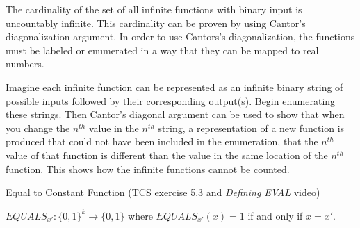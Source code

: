 \documentclass[11pt]{article}
\begin{document}
The cardinality of the set of all infinite functions with binary input is uncountably infinite. This cardinality can be proven by using Cantor's diagonalization argument. In order to use Cantors's diagonalization, the functions must be labeled or enumerated in a way that they can be mapped to real numbers. 

Imagine each infinite function can be represented as an infinite binary string of possible inputs followed by their corresponding output(s). Begin enumerating these strings. Then Cantor's diagonal argument can be used to show that when you change the $n^{th}$ value in the $n^{th}$ string, a representation of a new function is produced that could not have been included in the enumeration, that the $n^{th}$ value of that function is different than the value in the same location of the $n^{th}$ function. This shows how the infinite functions cannot be counted. 



\begin{problem}
Equal to Constant Function (TCS exercise 5.3 and \href{https://youtu.be/5RbgIcs0bEw}{\emph{Defining EVAL} video)}
\end{problem}

\begin{definition}
$EQUALS_{x'} : \{0,1\}^{k} \rightarrow \{0,1\}$ where $EQUALS_{x'}(x) = 1$ if and only if $x = x'$.
\end{definition}
\end{document}
